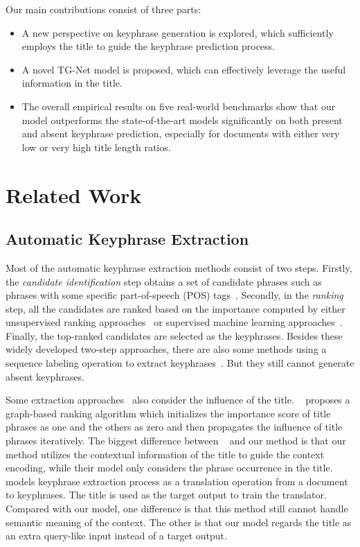 \documentclass[letterpaper]{article} %
\begin{document}
Our main contributions consist of three parts:
\begin{itemize}
\item A new perspective on keyphrase generation is explored, which sufficiently employs the title to guide the keyphrase prediction process.
\item A novel TG-Net model is proposed, which can effectively leverage the useful information in the title.
\item  The overall empirical results on five real-world benchmarks show that our model outperforms the state-of-the-art models significantly on both present and absent keyphrase prediction, especially for documents with either very low or very high title length ratios.
\end{itemize}


\section{Related Work} \label{section: related_work}
\subsection{Automatic Keyphrase Extraction}
Most of the automatic keyphrase extraction methods consist of two steps. Firstly, the \textit{candidate identification} step obtains a set of candidate phrases such as phrases with some specific part-of-speech (POS) tags~\cite{medelyan2009human,witten1999kea}. Secondly, in the \textit{ranking} step, all the candidates are ranked based on the importance computed by either unsupervised ranking approaches~\cite{wan2008single,mihalcea2004textrank,aaai_FlorescuC17_unsupervised} or supervised machine learning approaches~\cite{medelyan2009human,witten1999kea,nguyen2010wingnus_title,aaai_FlorescuJ18_supervised}. Finally, the top-ranked candidates are selected as the keyphrases. Besides these widely developed two-step approaches, there are also some methods using a sequence labeling operation to extract keyphrases~\cite{zhang2016keyphrase_twitter,luan2017scientific_seq_labeling,aaai_GollapalliLY17_seqlabel}. But they still cannot generate absent keyphrases.


Some extraction approaches~\cite{li2010semi_title,liu2011automatic_title} also consider the influence of the title. \citeauthor{li2010semi_title}~ proposes a graph-based ranking algorithm which initializes the importance score of title phrases as one and the others as zero and then propagates the influence of title phrases iteratively. The biggest difference between \citeauthor{li2010semi_title}~ and our method is that our method utilizes the contextual information of the title to guide the context encoding, while their model only considers the phrase occurrence in the title. \citeauthor{liu2011automatic_title}~ models keyphrase extraction process as a translation operation from a document to keyphrases. The title is used as the target output to train the translator. Compared with our model, one difference is that this method still cannot handle semantic meaning of the context. The other is that our model regards the title as an extra query-like input instead of a target output.
\end{document}
